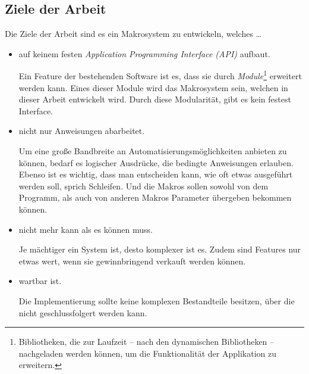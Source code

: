   \subsection{Ziele der Arbeit}
  \label{ssec:Ziele der Arbeit}
    Die Ziele der Arbeit sind es ein Makrosystem zu entwickeln, welches \ldots
    \begin{itemize}
      \item auf keinem festen \emph{Application Programming Interface (API)} aufbaut.

        Ein Feature der bestehenden Software ist es, dass sie durch \emph{Module}\footnote{
          Bibliotheken, die zur Laufzeit -- nach den dynamischen Bibliotheken --  nachgeladen werden können, um die Funktionalität der Applikation zu erweitern.
        } erweitert werden kann. Eines dieser Module wird das Makrosystem sein, welchen in dieser Arbeit entwickelt wird. Durch diese Modularität, gibt es kein festest Interface.

      \item nicht nur Anweisungen abarbeitet.

        Um eine große Bandbreite an Automatisierungsmöglichkeiten anbieten zu können, bedarf es logischer Ausdrücke, die bedingte Anweisungen erlauben. Ebenso ist es wichtig, dass man entscheiden kann, wie oft etwas ausgeführt werden soll, sprich Schleifen. Und die Makros sollen sowohl von dem Programm, als auch von anderen Makros Parameter übergeben bekommen können.

      \item nicht mehr kann als es können muss.

        Je mächtiger ein System ist, desto komplexer ist es. Zudem sind Features nur etwas wert, wenn sie gewinnbringend verkauft werden können.

      \item wartbar ist.

        Die Implementierung sollte keine komplexen Bestandteile besitzen, über die nicht geschlussfolgert werden kann.
    \end{itemize}

